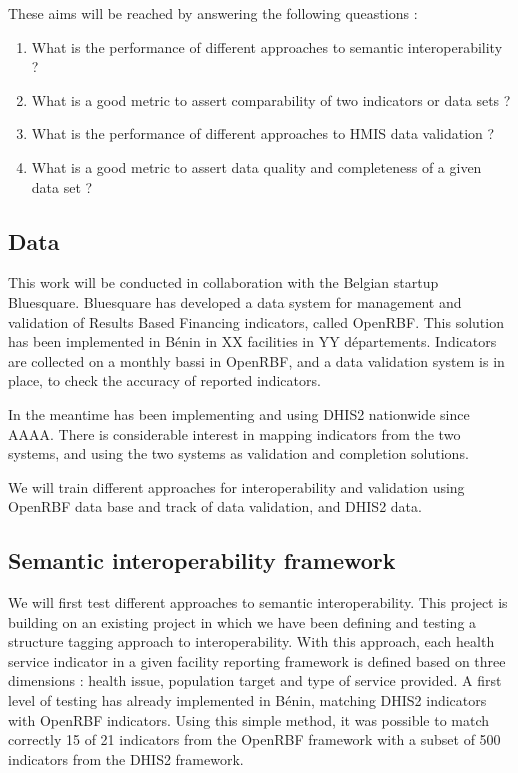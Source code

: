 \documentclass[a4paper,11pt,draft,twoside]{article}
\begin{document}
These aims will be reached by answering the following queastions :

\begin{enumerate}
\item What is the performance of different approaches to semantic interoperability ?
\item What is a good metric to assert comparability of two indicators or data sets ?
\item What is the performance of different approaches to HMIS data validation ?
\item What is a good metric to assert data quality and completeness of a given data set ?
\end{enumerate}


\subsection{Data}

This work will be conducted in collaboration with the Belgian startup Bluesquare. Bluesquare has developed a data system for management and validation of Results Based Financing indicators, called OpenRBF. This solution has been implemented in Bénin in XX facilities in YY départements. Indicators are collected on a monthly bassi in OpenRBF, and a data validation system is in place, to check the accuracy of reported indicators.

In the meantime has been implementing and using DHIS2 nationwide since AAAA. There is considerable interest in mapping indicators from the two systems, and using the two systems as validation and completion solutions.

We will train different approaches for interoperability and validation using OpenRBF data base and track of data validation, and DHIS2 data.

\subsection{Semantic interoperability framework}

We will first test different approaches to semantic interoperability. This project is building on an existing project in which we have been defining and testing a structure tagging approach to interoperability. With this approach, each health service indicator in a given facility reporting framework is defined based on three dimensions : health issue, population target and type of service provided. A first level of testing has already implemented in Bénin, matching DHIS2 indicators with OpenRBF indicators. Using this simple method, it was possible to match correctly 15 of 21 indicators from the OpenRBF framework with a subset of 500 indicators from the DHIS2 framework.
\end{document}
